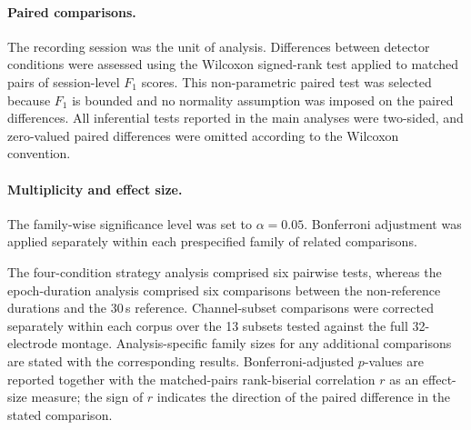 
\paragraph{Paired comparisons.}
The recording session was the unit of analysis. Differences between detector
conditions were assessed using the Wilcoxon signed-rank test applied to matched
pairs of session-level $F_1$ scores. This non-parametric paired test was selected
because $F_1$ is bounded and no normality assumption was imposed on the paired
differences. All inferential tests reported in the main analyses were
two-sided, and zero-valued paired differences were omitted according to the
Wilcoxon convention.

\paragraph{Multiplicity and effect size.}
The family-wise significance level was set to $\alpha=0.05$. Bonferroni
adjustment was applied separately within each prespecified family of related comparisons.

The four-condition strategy analysis comprised six pairwise tests,
whereas the epoch-duration analysis comprised six comparisons between the
non-reference durations and the 30\,s reference. Channel-subset comparisons were
corrected separately within each corpus over the 13 subsets tested against the
full 32-electrode montage. Analysis-specific family sizes for any additional
comparisons are stated with the corresponding results. Bonferroni-adjusted
$p$-values are reported together with the matched-pairs rank-biserial
correlation $r$ as an effect-size measure; the sign of $r$ indicates the
direction of the paired difference in the stated comparison.
